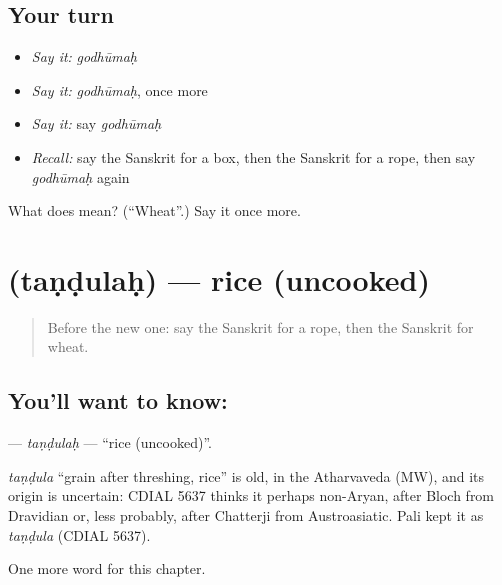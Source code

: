 \subsection*{Your turn}
\begin{itemize}
\raggedright
  \item \emph{Say it:} \emph{godhūmaḥ}
  \item \emph{Say it:} \emph{godhūmaḥ}, once more
  \item \emph{Say it:} say \emph{godhūmaḥ}
  \item \emph{Recall:} say the Sanskrit for a box, then the Sanskrit for a rope, then say \emph{godhūmaḥ} again
\end{itemize}

\begin{tcolorbox}[breakable,colback=teal!4,colframe=teal!35!black,title={Before you move on}]
What does  mean? (\textquotedblleft{}Wheat\textquotedblright{}.) Say it once more.
\end{tcolorbox}
\section[\texorpdfstring{\sk{तण्डुलः} (taṇḍulaḥ)}{तण्डुलः (taṇḍulaḥ)}]{ (taṇḍulaḥ) — rice (uncooked)}

\label{lesson:SA-C106-tandulah}



\begin{quote}
Before the new one: say the Sanskrit for a rope, then the Sanskrit for wheat.
\end{quote}

\subsection*{You'll want to know: }
\textbf{} — \emph{taṇḍulaḥ} — \textquotedblleft{}rice (uncooked)\textquotedblright{}.

\begin{cousinweb}
\emph{taṇḍula} \textquotedblleft{}grain after threshing, rice\textquotedblright{} is old, in the Atharvaveda (MW), and its origin is uncertain: CDIAL 5637 thinks it perhaps non-Aryan, after Bloch from Dravidian or, less probably, after Chatterji from Austroasiatic. Pali kept it as \emph{taṇḍula} (CDIAL 5637).
\end{cousinweb}

\begin{grammarlens}[title={What you've built}]
One more word for this chapter.
\end{grammarlens}


